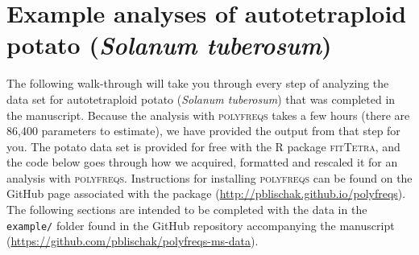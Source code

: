 \documentclass[]{article}
\title{}
\author{}
\date{}
\begin{document}
\maketitle


\section{\texorpdfstring{Example analyses of autotetraploid potato
(\emph{Solanum
tuberosum})}{Example analyses of autotetraploid potato (Solanum tuberosum)}}\label{example-analyses-of-autotetraploid-potato-solanum-tuberosum}

The following walk-through will take you through every step of analyzing
the data set for autotetraploid potato (\emph{Solanum tuberosum}) that
was completed in the manuscript. Because the analysis with
\textsc{polyfreqs} takes a few hours (there are 86,400 parameters to
estimate), we have provided the output from that step for you. The
potato data set is provided for free with the R package
\textsc{fitTetra}, and the code below goes through how we acquired, formatted and
rescaled it for an analysis with \textsc{polyfreqs}. Instructions for
installing \textsc{polyfreqs} can be found on the GitHub page associated
with the package (\url{http://pblischak.github.io/polyfreqs}). The
following sections are intended to be completed with the data in the
\texttt{example/} folder found in the GitHub repository accompanying the manuscript 
(\url{https://github.com/pblischak/polyfreqs-ms-data}).
\end{document}
